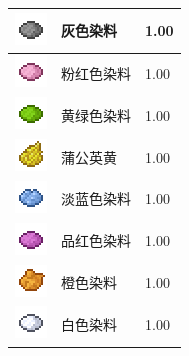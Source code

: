 \documentclass[UTF8]{ctexart}
\begin{document}
\begin{longtable}[]{|p{1cm}|p{8cm}|p{1.5cm}|}
	\hline
	\includegraphics{.workspace/icons/minecraft/minecraft__dye__8.png} & 灰色染料 &1.00\\
	\hline
	\includegraphics{.workspace/icons/minecraft/minecraft__dye__9.png} & 粉红色染料 &1.00\\
	\hline
	\includegraphics{.workspace/icons/minecraft/minecraft__dye__10.png} & 黄绿色染料 &1.00\\
	\hline
	\includegraphics{.workspace/icons/minecraft/minecraft__dye__11.png} & 蒲公英黄 &1.00\\
	\hline
	\includegraphics{.workspace/icons/minecraft/minecraft__dye__12.png} & 淡蓝色染料 &1.00\\
	\hline
	\includegraphics{.workspace/icons/minecraft/minecraft__dye__13.png} & 品红色染料 &1.00\\
	\hline
	\includegraphics{.workspace/icons/minecraft/minecraft__dye__14.png} & 橙色染料 &1.00\\
	\hline
	\includegraphics{.workspace/icons/biomesoplenty/biomesoplenty__white_dye__0.png} & 白色染料 &1.00\\
	\hline

\end{longtable}
\end{document}
